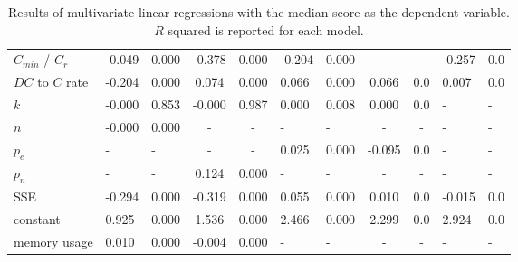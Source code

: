 \begin{table}[h]
\begin{center}
{\begin{tabular}{lggccggccgg}
    $C_{min}$ / $C_r$  & -0.049 &  0.000 & -0.378 &  0.000 & -0.204 &  0.000 &      - &      - & -0.257 &    0.0 \\
    $DC$ to $C$ rate   & -0.204 &  0.000 &  0.074 &  0.000 &  0.066 &  0.000 &  0.066 &    0.0 &  0.007 &    0.0 \\
    $k$                & -0.000 &  0.853 & -0.000 &  0.987 &  0.000 &  0.008 &  0.000 &    0.0 &      - &      - \\
    $n$                & -0.000 &  0.000 &      - &      - &      - &      - &      - &      - &      - &      - \\
    $p_e$              &      - &      - &      - &      - &  0.025 &  0.000 & -0.095 &    0.0 &      - &      - \\
    $p_n$              &      - &      - &  0.124 &  0.000 &      - &      - &      - &      - &      - &      - \\
    SSE                & -0.294 &  0.000 & -0.319 &  0.000 &  0.055 &  0.000 &  0.010 &    0.0 & -0.015 &    0.0 \\
    constant           &  0.925 &  0.000 &  1.536 &  0.000 &  2.466 &  0.000 &  2.299 &    0.0 &  2.924 &    0.0 \\
    memory usage       &  0.010 &  0.000 & -0.004 &  0.000 &      - &      - &      - &      - &      - &      - \\
    \bottomrule
\end{tabular}}
\end{center}
\caption{Results of multivariate linear regressions with the median score as the dependent variable.
\(R\) squared is reported for each model.}
\label{table:linear_regression_on_median}
\end{table}